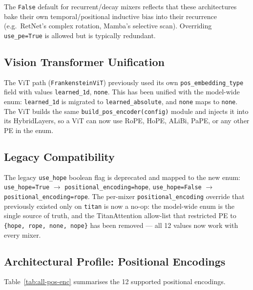 The \texttt{False} default for recurrent/decay mixers reflects that
these architectures bake their own temporal/positional inductive bias
into their recurrence (e.g.\ RetNet's complex rotation, Mamba's
selective scan). Overriding \texttt{use\_pe=True} is allowed but is
typically redundant.

\subsection{Vision Transformer Unification}

The ViT path (\texttt{FrankensteinViT}) previously used its own
\texttt{pos\_embedding\_type} field with values
\texttt{learned\_1d}, \texttt{none}. This has been unified with the
model-wide enum: \texttt{learned\_1d} is migrated to
\texttt{learned\_absolute}, and \texttt{none} maps to \texttt{none}.
The ViT builds the same \texttt{build\_pos\_encoder(config)} module and
injects it into its HybridLayers, so a ViT can now use RoPE, HoPE, ALiBi,
PaPE, or any other PE in the enum.

\subsection{Legacy Compatibility}

The legacy \texttt{use\_hope} boolean flag is deprecated and mapped to
the new enum: \texttt{use\_hope=True} $\to$ \texttt{positional\_encoding=hope},
\texttt{use\_hope=False} $\to$ \texttt{positional\_encoding=rope}. The
per-mixer \texttt{positional\_encoding} override that previously
existed only on \texttt{titan} is now a no-op: the model-wide
enum is the single source of truth, and the TitanAttention allow-list
that restricted PE to \texttt{\{hope, rope, none, nope\}} has been
removed --- all 12 values now work with every mixer.

\subsection{Architectural Profile: Positional Encodings}

Table~\ref{tab:all-pos-enc} summarises the 12 supported positional
encodings.

